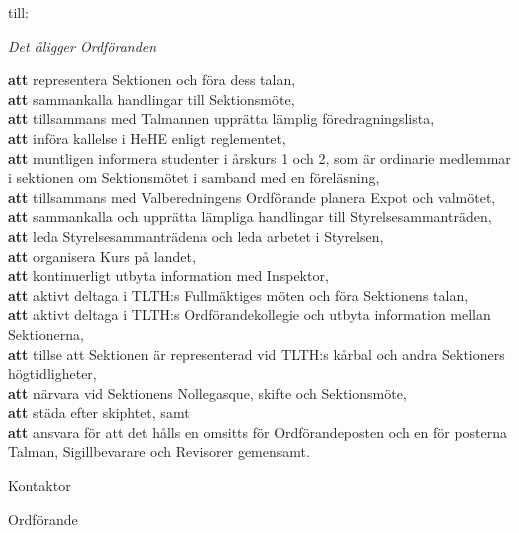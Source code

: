 \documentclass[../_main/handlingar.tex]{subfiles}
\begin{document}
\begin{attsatser}
    till:\par
    {\it
    Det åligger Ordföranden\par
    \textbf{att} representera Sektionen och föra dess talan,\\
    \textbf{att} sammankalla handlingar till Sektionsmöte,\\
    \textbf{att} tillsammans med Talmannen upprätta lämplig föredragningslista,\\
    \textbf{att} införa kallelse i HeHE enligt reglementet,\\
    \textbf{att} muntligen informera studenter i årskurs 1 och 2, som är ordinarie medlemmar i sektionen om Sektionsmötet i samband med en föreläsning,\\
    \textbf{att} tillsammans med Valberedningens Ordförande planera Expot och valmötet,\\
    \textbf{att} sammankalla och upprätta lämpliga handlingar till Styrelsesammanträden,\\
    \textbf{att} leda Styrelsesammanträdena och leda arbetet i Styrelsen,\\
    \textbf{att} organisera Kurs på landet,\\
    \textbf{att} kontinuerligt utbyta information med Inspektor,\\
    \textbf{att} aktivt deltaga i TLTH:s Fullmäktiges möten och föra Sektionens talan,\\
    \textbf{att} aktivt deltaga i TLTH:s Ordförandekollegie och utbyta information mellan Sektionerna,\\
    \textbf{att} tillse att Sektionen är representerad vid TLTH:s kårbal och andra Sektioners högtidligheter,\\
    \textbf{att} närvara vid Sektionens Nollegasque, skifte och Sektionsmöte,\\
    \textbf{att} städa efter skiphtet, samt\\
    \textbf{att} ansvara för att det hålls en omsitts för Ordförandeposten och en för posterna Talman, Sigillbevarare och Revisorer gemensamt.
    }


\end{attsatser}



\begin{signatures}{2}
    \ist
    \signature{Erik Månsson}{Kontaktor}
    \signature{Fredrik Peterson}{Ordförande}
\end{signatures}
\end{document}
